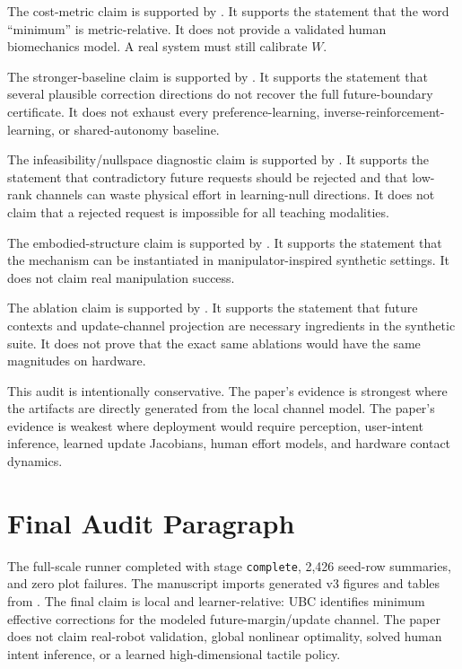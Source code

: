 \documentclass{article}
\begin{document}
The cost-metric claim is supported by
. It supports the
statement that the word ``minimum'' is metric-relative. It does not provide a
validated human biomechanics model. A real system must still calibrate $W$.

The stronger-baseline claim is supported by
. It supports the
statement that several plausible correction directions do not recover the full
future-boundary certificate. It does not exhaust every preference-learning,
inverse-reinforcement-learning, or shared-autonomy baseline.

The infeasibility/nullspace diagnostic claim is supported by
. It supports
the statement that contradictory future requests should be rejected and that
low-rank channels can waste physical effort in learning-null directions. It does
not claim that a rejected request is impossible for all teaching modalities.

The embodied-structure claim is supported by
. It supports the statement
that the mechanism can be instantiated in manipulator-inspired synthetic
settings. It does not claim real manipulation success.

The ablation claim is supported by
. It supports the statement
that future contexts and update-channel projection are necessary ingredients in
the synthetic suite. It does not prove that the exact same ablations would have
the same magnitudes on hardware.

This audit is intentionally conservative. The paper's evidence is strongest
where the artifacts are directly generated from the local channel model. The
paper's evidence is weakest where deployment would require perception,
user-intent inference, learned update Jacobians, human effort models, and
hardware contact dynamics.

\section{Final Audit Paragraph}

The full-scale runner completed with stage \texttt{complete}, 2,426 seed-row
summaries, and zero plot failures. The manuscript imports generated v3 figures
and tables from . The final claim is local and
learner-relative: UBC identifies minimum effective corrections for the modeled
future-margin/update channel. The paper does not claim real-robot validation,
global nonlinear optimality, solved human intent inference, or a learned
high-dimensional tactile policy.
\end{document}
